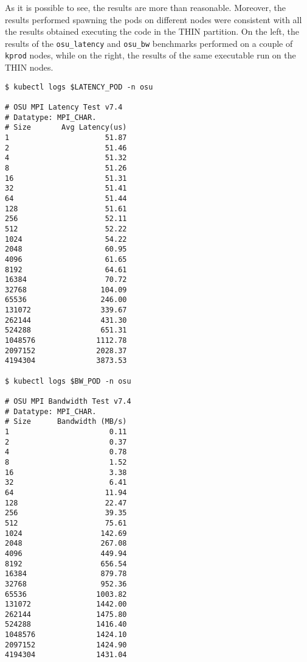 As it is possible to see, the results are more than reasonable.
Moreover, the results performed spawning the pods on different nodes were
consistent with all the results obtained executing the code in the THIN
partition.
On the left, the results of the \texttt{osu\_latency} and \texttt{osu\_bw}
benchmarks performed on a couple of \texttt{kprod} nodes, while on the right,
the results of the same executable run on the THIN nodes.


\begin{minipage}[t]{0.48\textwidth}
\begin{verbatim}
$ kubectl logs $LATENCY_POD -n osu

# OSU MPI Latency Test v7.4
# Datatype: MPI_CHAR.
# Size       Avg Latency(us)
1                      51.87
2                      51.46
4                      51.32
8                      51.26
16                     51.31
32                     51.41
64                     51.44
128                    51.61
256                    52.11
512                    52.22
1024                   54.22
2048                   60.95
4096                   61.65
8192                   64.61
16384                  70.72
32768                 104.09
65536                 246.00
131072                339.67
262144                431.30
524288                651.31
1048576              1112.78
2097152              2028.37
4194304              3873.53

$ kubectl logs $BW_POD -n osu

# OSU MPI Bandwidth Test v7.4
# Datatype: MPI_CHAR.
# Size      Bandwidth (MB/s)
1                       0.11
2                       0.37
4                       0.78
8                       1.52
16                      3.38
32                      6.41
64                     11.94
128                    22.47
256                    39.35
512                    75.61
1024                  142.69
2048                  267.08
4096                  449.94
8192                  656.54
16384                 879.78
32768                 952.36
65536                1003.82
131072               1442.00
262144               1475.80
524288               1416.40
1048576              1424.10
2097152              1424.90
4194304              1431.04
\end{verbatim}
\end{minipage}
\hfill
